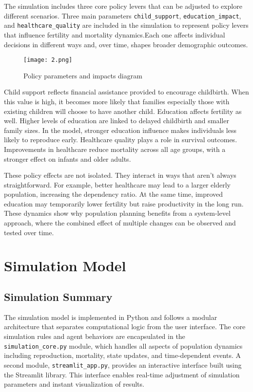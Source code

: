 \documentclass[12pt]{article}
\begin{document}
The simulation includes three core policy levers that can be adjusted to explore different scenarios. Three main parameters \texttt{child\_support}, \texttt{education\_impact}, and \texttt{healthcare\_quality} are included in the simulation to represent policy levers that influence fertility and mortality dynamics.Each one affects individual decisions in different ways and, over time, shapes broader demographic outcomes.

\begin{figure}[H]
    \centering
    \texttt{[image: 2.png]} %
    \caption{Policy parameters and impacts diagram}
\end{figure}
Child support reflects financial assistance provided to encourage childbirth. When this value is high, it becomes more likely that families especially those with existing children will choose to have another child. Education affects fertility as well. 
Higher levels of education are linked to delayed childbirth and smaller family sizes. In the model, stronger education influence makes individuals less likely to reproduce early. 
Healthcare quality plays a role in survival outcomes. Improvements in healthcare reduce mortality across all age groups, with a stronger effect on infants and older adults.

These policy effects are not isolated. They interact in ways that aren’t always straightforward. For example, better healthcare may lead to a larger elderly population, increasing the dependency ratio. At the same time, improved education may temporarily lower fertility but raise productivity in the long run. These dynamics show why population planning benefits from a system-level approach, where the combined effect of multiple changes can be observed and tested over time.


\newpage
\section{Simulation Model}

\subsection{Simulation Summary}

The simulation model is implemented in Python and follows a modular architecture that separates computational logic from the user interface. The core simulation rules and agent behaviors are encapsulated in the \texttt{simulation\_core.py} module, which handles all aspects of population dynamics including reproduction, mortality, state updates, and time-dependent events. A second module, \texttt{streamlit\_app.py}, provides an interactive interface built using the Streamlit library. This interface enables real-time adjustment of simulation parameters and instant visualization of results.
\end{document}
